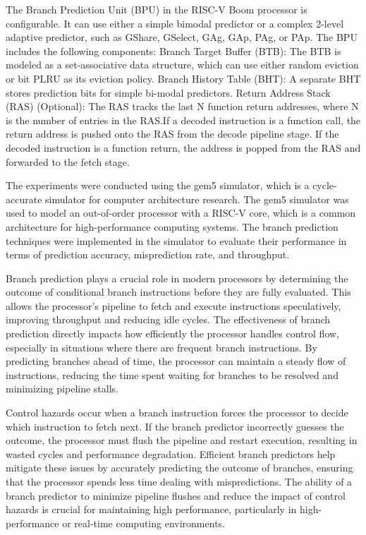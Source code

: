 \documentclass[10pt,journal,compsoc]{IEEEtran}
\begin{document}
The Branch Prediction Unit (BPU) in the RISC-V Boom processor is configurable. It can use either a simple bimodal predictor or a complex 2-level adaptive predictor, such as GShare, GSelect, GAg, GAp, PAg, or PAp.
The BPU includes the following components:
Branch Target Buffer (BTB): The BTB is modeled as a set-associative data structure, which can use either random eviction or bit PLRU as its eviction policy.
Branch History Table (BHT): A separate BHT stores prediction bits for simple bi-modal predictors.
Return Address Stack (RAS) (Optional): The RAS tracks the last N function return addresses, where N is the number of entries in the RAS.If a decoded instruction is a function call, the return address is pushed onto the RAS from the decode pipeline stage. If the decoded instruction is a function return, the address is popped from the RAS and forwarded to the fetch stage.\cite{BranchPredictionRISCVBOOMa,BranchPredictionUnita}

The experiments were conducted using the gem5 simulator, which is a cycle-accurate simulator for computer architecture research.\cite{lowepower2020gem5simulatorversion200}
The gem5 simulator was used to model an out-of-order processor with a RISC-V core, which is a common architecture for high-performance computing systems.
The branch prediction techniques were implemented in the simulator to evaluate their performance in terms of prediction accuracy, misprediction rate, and throughput.

Branch prediction plays a crucial role in modern processors by determining the outcome of conditional branch instructions before they are fully evaluated. This allows the processor's pipeline to fetch and execute instructions speculatively, improving throughput and reducing idle cycles. The effectiveness of branch prediction directly impacts how efficiently the processor handles control flow, especially in situations where there are frequent branch instructions. By predicting branches ahead of time, the processor can maintain a steady flow of instructions, reducing the time spent waiting for branches to be resolved and minimizing pipeline stalls.\cite{1003559}

Control hazards occur when a branch instruction forces the processor to decide which instruction to fetch next. If the branch predictor incorrectly guesses the outcome, the processor must flush the pipeline and restart execution, resulting in wasted cycles and performance degradation. Efficient branch predictors help mitigate these issues by accurately predicting the outcome of branches, ensuring that the processor spends less time dealing with mispredictions. The ability of a branch predictor to minimize pipeline flushes and reduce the impact of control hazards is crucial for maintaining high performance, particularly in high-performance or real-time computing environments.\cite{matsuiEfficientImplementationTAGE2019,calderFastAccurateInstruction1994a,choudhuryOptimizedRISCVProcessor2022,heSurveyComparisonPipeline2023a,emmaCharacterizationBranchData1987a}
\end{document}
